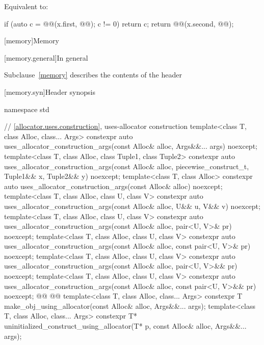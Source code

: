 \documentclass{wg21}
\begin{document}
\begin{itemdescr}
    \pnum
    \effects
    Equivalent to:
    \begin{codeblock}
        if (auto c = @@(x.first, @@); c != 0) return c;
        return @@(x.second, @@);
    \end{codeblock}
\end{itemdescr}


[memory]{Memory}

[memory.general]{In general}

\pnum
Subclause~\ref{memory} describes the contents of the header

[memory.syn]{Header  synopsis}

\begin{codeblock}
    namespace std {

        // \ref{allocator.uses.construction}, uses-allocator construction
        template<class T, class Alloc, class... Args>
        constexpr auto uses_allocator_construction_args(const Alloc& alloc,
        Args&&... args) noexcept;
        template<class T, class Alloc, class Tuple1, class Tuple2>
        constexpr auto uses_allocator_construction_args(const Alloc& alloc, piecewise_construct_t,
        Tuple1&& x, Tuple2&& y) noexcept;
        template<class T, class Alloc>
        constexpr auto uses_allocator_construction_args(const Alloc& alloc) noexcept;
        template<class T, class Alloc, class U, class V>
        constexpr auto uses_allocator_construction_args(const Alloc& alloc,
        U&& u, V&& v) noexcept;
        template<class T, class Alloc, class U, class V>
        constexpr auto uses_allocator_construction_args(const Alloc& alloc,
        pair<U, V>& pr) noexcept;
        template<class T, class Alloc, class U, class V>
        constexpr auto uses_allocator_construction_args(const Alloc& alloc,
        const pair<U, V>& pr) noexcept;
        template<class T, class Alloc, class U, class V>
        constexpr auto uses_allocator_construction_args(const Alloc& alloc,
        pair<U, V>&& pr) noexcept;
        template<class T, class Alloc, class U, class V>
        constexpr auto uses_allocator_construction_args(const Alloc& alloc,
        const pair<U, V>&& pr) noexcept;
        @@
        @@
        template<class T, class Alloc, class... Args>
        constexpr T make_obj_using_allocator(const Alloc& alloc, Args&&... args);
        template<class T, class Alloc, class... Args>
        constexpr T* uninitialized_construct_using_allocator(T* p, const Alloc& alloc,
        Args&&... args);
    }
\end{codeblock}
\end{document}
